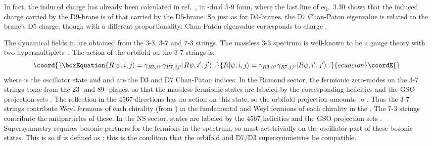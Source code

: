 \documentclass[a4paper,12pt]{article}
\renewcommand{\=}[1]{\bar{#1}}
\providecommand{\OL}[1]{ \hspace{1pt}\overline{\hspace{-1pt}#1
   \hspace{-1pt}}\hspace{1pt} }
\begin{document}
In fact, the induced charge
has already been calculated in ref.~\cite{gimpol}, in
\coordHE{}-dual 5-9 form, where the last line of eq.~3.30 shows that the induced
charge carried by the D9-brane is \coordHE{} of that carried by the
D5-brane.  So just as for D3-branes, the
D7 Chan-Paton eigenvalue is related to the brane's D5 charge, though with a
different proportionality: Chan-Paton eigenvalue \coordHE{} corresponds to charge
\coordHE{}.

The dynamical fields in \coordHE{} are obtained from the 3-3, 3-7 and 7-3 strings.
The massless 3-3 spectrum is well-known to be a \coordHE{} gauge theory with two \myHighlight{$({ N}_{3^+},\OL{{
N}}_{3^-})\oplus(\OL{{ N}}_{3^+}, { N}_{3^-})$}\coordHE{}
hypermultiplets~\cite{quiver,GK-KN}.  The action of the  orbifold on
the 3-7 strings is:
\begin{equation}\coord{}\boxEquation{
R|\psi,i,j
\rangle=\gamma_{R3,i i'}\gamma_{R7,jj'}|R\psi,i',j'\rangle\ .
}{
R|\psi,i,j
\rangle=\gamma_{R3,i i'}\gamma_{R7,jj'}|R\psi,i',j'\rangle\ .
}{ecuacion}\coordE{}\end{equation}
where \myHighlight{$\psi$}\coordHE{} is the oscillator state and \coordHE{} and \coordHE{} are the D3 and D7
Chan-Paton indices.
In the Ramond sector, the fermionic zero-modes on the 3-7 strings come from
the 23- and 89- planes, so that the massless fermionic states are
labeled by the  corresponding helicities \coordHE{} and the GSO
projection sets \coordHE{}.  The reflection in the 4567-directions has no
action on this state, so the orbifold projection amounts to
\coordHE{}.  Thus the 3-7 strings contribute
\coordHE{} Weyl fermions of each chirality (from \coordHE{}) in
the fundamental \coordHE{} and \coordHE{} Weyl
fermions of each chirality in the
\coordHE{}.  The 7-3 strings contribute the antiparticles of
these.  In the NS sector,  states are labeled by the 4567 helicities
\coordHE{} and the GSO projection sets \coordHE{}.
Supersymmetry requires bosonic partners for the fermions in the
spectrum, so
\coordHE{} must act trivially on the oscillator part of these bosonic states.  This
is so if \coordHE{} is defined as \coordHE{}: this is the condition that
the orbifold and D7/D3 supersymmetries be compatible.
\end{document}
